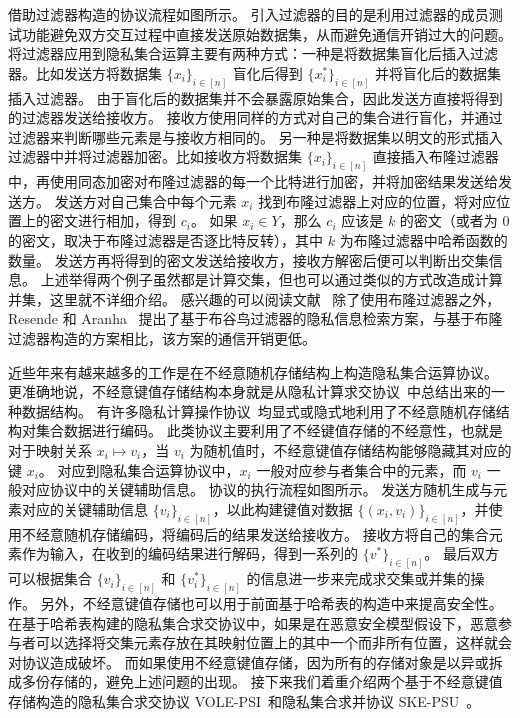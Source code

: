 借助过滤器构造的协议流程如图所示。
引入过滤器的目的是利用过滤器的成员测试功能避免双方交互过程中直接发送原始数据集，从而避免通信开销过大的问题。
将过滤器应用到隐私集合运算主要有两种方式：一种是将数据集盲化后插入过滤器。比如发送方将数据集 $\{x_i\}_{i\in[n]}$ 盲化后得到 $\{x^*_i\}_{i\in[n]}$ 并将盲化后的数据集插入过滤器。
由于盲化后的数据集并不会暴露原始集合，因此发送方直接将得到的过滤器发送给接收方。
接收方使用同样的方式对自己的集合进行盲化，并通过过滤器来判断哪些元素是与接收方相同的。
另一种是将数据集以明文的形式插入过滤器中并将过滤器加密。比如接收方将数据集 $\{x_i\}_{i\in [n]}$ 直接插入布隆过滤器中，再使用同态加密对布隆过滤器的每一个比特进行加密，并将加密结果发送给发送方。
发送方对自己集合中每个元素 $x_i$ 找到布隆过滤器上对应的位置，将对应位置上的密文进行相加，得到 $c_i$。
如果 $x_i\in Y$，那么 $c_i$ 应该是 $k$ 的密文（或者为 $0$ 的密文，取决于布隆过滤器是否逐比特反转），其中 $k$ 为布隆过滤器中哈希函数的数量。
发送方再将得到的密文发送给接收方，接收方解密后便可以判断出交集信息。
上述举得两个例子虽然都是计算交集，但也可以通过类似的方式改造成计算并集，这里就不详细介绍。
感兴趣的可以阅读文献~\cite{davidson2017efficient,chen2024private}
除了使用布隆过滤器之外，Resende 和 Aranha~\cite{resende2018faster} 提出了基于布谷鸟过滤器的隐私信息检索方案，与基于布隆过滤器构造的方案相比，该方案的通信开销更低。

近些年来有越来越多的工作是在不经意随机存储结构上构造隐私集合运算协议。
更准确地说，不经意键值存储结构本身就是从隐私计算求交协议~\cite{garimella2021oblivious}中总结出来的一种数据结构。
有许多隐私计算操作协议~\cite{kolesnikov2019scalable,garimella2021private,rindal2021volepsi,zhang2023linear}均显式或隐式地利用了不经意随机存储结构对集合数据进行编码。
此类协议主要利用了不经键值存储的不经意性，也就是对于映射关系 $x_i \mapsto v_i$，当 $v_i$ 为随机值时，不经意键值存储结构能够隐藏其对应的键 $x_i$。
对应到隐私集合运算协议中，$x_i$ 一般对应参与者集合中的元素，而 $v_i$ 一般对应协议中的关键辅助信息。
协议的执行流程如图所示。
发送方随机生成与元素对应的关键辅助信息 $\{v_i\}_{i\in [n]}$，以此构建键值对数据 $\{(x_i, v_i)\}_{i\in [n]}$，并使用不经意随机存储编码，将编码后的结果发送给接收方。
接收方将自己的集合元素作为输入，在收到的编码结果进行解码，得到一系列的 $\{v^*\}_{i\in [n]}$。
最后双方可以根据集合 $\{v_i\}_{i\in [n]}$ 和 $\{v_i^*\}_{i\in [n]}$ 的信息进一步来完成求交集或并集的操作。
另外，不经意键值存储也可以用于前面基于哈希表的构造中来提高安全性。
在基于哈希表构建的隐私集合求交协议中，如果是在恶意安全模型假设下，恶意参与者可以选择将交集元素存放在其映射位置上的其中一个而非所有位置，这样就会对协议造成破坏。
而如果使用不经意键值存储，因为所有的存储对象是以异或拆成多份存储的，避免上述问题的出现。
接下来我们着重介绍两个基于不经意键值存储构造的隐私集合求交协议 VOLE-PSI~\cite{rindal2021volepsi}和隐私集合求并协议 SKE-PSU~\cite{zhang2023linear}。

